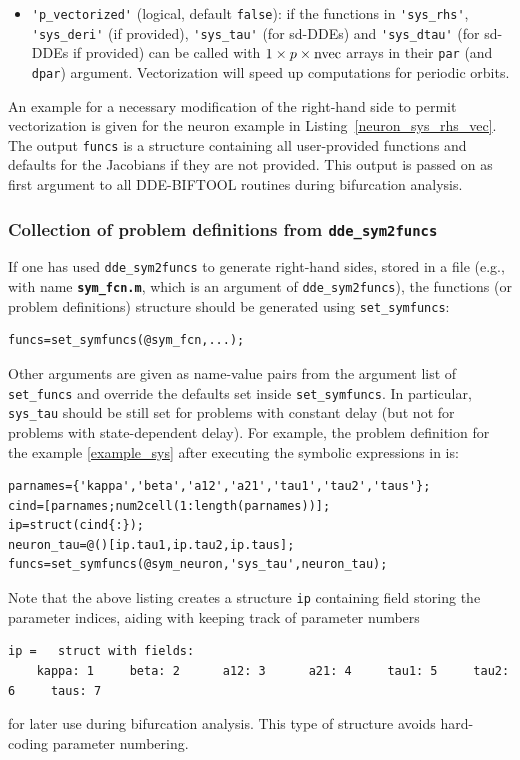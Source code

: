 \documentclass[10pt]{scrartcl}
\newcommand{\DDEBIFCODE}{\textsc{DDE-BIFTOOL}}
\newcommand{\file}[1]{\textbf{\texttt{#1}}}
\newcommand{\blist}[1]{\mbox{\lstinline!#1!}}
\begin{document}
\begin{itemize}
  functions in \blist{'sys_rhs'}, \blist{'sys_dirderi'}
  \blist{'sys_deri'} (if provided), \blist{'sys_tau'} (for sd-DDEs)
  \blist{'sys_dirdtau'} and \blist{'sys_dtau'} (for sd-DDEs if
  provided) can be called with $3$d arrays in their \blist{xx} (and
  \blist{dxx}) argument. Vectorization will speed up computations for
  periodic orbits.
\item \blist{'p_vectorized'} (logical, default \blist{false}): if the
  functions in \blist{'sys_rhs'}, \blist{'sys_deri'} (if provided),
  \blist{'sys_tau'} (for sd-DDEs) and \blist{'sys_dtau'} (for sd-DDEs
  if provided) can be called with $1\times p\times \blist{nvec}$
  arrays in their \blist{par} (and \blist{dpar})
  argument. Vectorization will speed up computations for periodic
  orbits.
\end{itemize}
An example for a necessary modification of the right-hand side to
permit vectorization is given for the neuron example in
Listing~\ref{neuron_sys_rhs_vec}. The output \blist{funcs} is a
structure containing all user-provided functions and defaults for the
Jacobians if they are not provided. This output is passed on as first
argument to all \DDEBIFCODE{} routines during bifurcation analysis.

\subsubsection{Collection of problem definitions from \blist{dde_sym2funcs}}
\label{sec:symfuncs}
If one has used \blist{dde_sym2funcs} to generate right-hand sides,
stored in a file (e.g., with name \file{sym\_fcn.m}, which is an
argument of \blist{dde_sym2funcs}), the functions (or problem
definitions) structure should be generated using \blist{set_symfuncs}:
\begin{lstlisting}
funcs=set_symfuncs(@sym_fcn,...);
\end{lstlisting}
Other arguments are given as name-value pairs from the argument list
of \blist{set_funcs} and override the defaults set inside
\blist{set_symfuncs}. In particular, \blist{sys_tau} should be still
set for problems with constant delay (but not for problems with
state-dependent delay). For example, the problem definition for the example \eqref{example_sys} after executing the symbolic expressions in  is:
\begin{lstlisting}
parnames={'kappa','beta','a12','a21','tau1','tau2','taus'};
cind=[parnames;num2cell(1:length(parnames))];
ip=struct(cind{:});
neuron_tau=@()[ip.tau1,ip.tau2,ip.taus];
funcs=set_symfuncs(@sym_neuron,'sys_tau',neuron_tau);
\end{lstlisting}
Note that the above listing creates a structure \blist{ip} containing field storing the parameter indices, aiding with keeping track of parameter numbers
\begin{lstlisting}
ip =   struct with fields:
    kappa: 1     beta: 2      a12: 3      a21: 4     tau1: 5     tau2: 6     taus: 7
\end{lstlisting}
for later use during bifurcation analysis. This type of structure avoids hard-coding parameter numbering.
\end{document}
